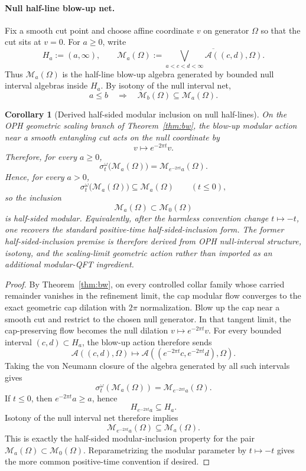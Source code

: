\documentclass[11pt]{article}
\newtheorem{corollary}[theorem]{Corollary}
\begin{document}
\paragraph{Null half-line blow-up net.}
Fix a smooth cut point and choose affine coordinate \(v\) on generator \(\Omega\) so that the cut sits at \(v=0\). For \(a\ge 0\), write
\[
H_a:=(a,\infty),
\qquad
\mathcal M_a(\Omega)
:=
\overline{\bigvee_{a<c<d<\infty}\mathcal A((c,d),\Omega)}.
\]
Thus \(\mathcal M_a(\Omega)\) is the half-line blow-up algebra generated by bounded null interval algebras inside \(H_a\). By isotony of the null interval net,
\[
a\le b
\quad\Longrightarrow\quad
\mathcal M_b(\Omega)\subseteq \mathcal M_a(\Omega).
\]

\begin{corollary}[Derived half-sided modular inclusion on null half-lines]\label{cor:n2}
On the OPH geometric scaling branch of Theorem~\ref{thm:bw}, the blow-up modular action near a smooth entangling cut acts on the null coordinate by
\[
v\mapsto e^{-2\pi t}v.
\]
Therefore, for every \(a\ge 0\),
\[
\sigma_t^\omega\bigl(\mathcal M_a(\Omega)\bigr)
=
\mathcal M_{e^{-2\pi t}a}(\Omega).
\]
Hence, for every \(a>0\),
\[
\sigma_t^\omega\bigl(\mathcal M_a(\Omega)\bigr)\subseteq \mathcal M_a(\Omega)
\qquad (t\le 0),
\]
so the inclusion
\[
\mathcal M_a(\Omega)\subset \mathcal M_0(\Omega)
\]
is half-sided modular. Equivalently, after the harmless convention change \(t\mapsto -t\), one recovers the standard positive-time half-sided-inclusion form. The former half-sided-inclusion premise is therefore derived from OPH null-interval structure, isotony, and the scaling-limit geometric action rather than imported as an additional modular-QFT ingredient.
\end{corollary}

\begin{proof}
By Theorem~\ref{thm:bw}, on every controlled collar family whose carried remainder vanishes in the refinement limit, the cap modular flow converges to the exact geometric cap dilation with \(2\pi\) normalization. Blow up the cap near a smooth cut and restrict to the chosen null generator. In that tangent limit, the cap-preserving flow becomes the null dilation \(v\mapsto e^{-2\pi t}v\). For every bounded interval \((c,d)\subset H_a\), the blow-up action therefore sends
\[
\mathcal A((c,d),\Omega)\longmapsto \mathcal A((e^{-2\pi t}c,e^{-2\pi t}d),\Omega).
\]
Taking the von Neumann closure of the algebra generated by all such intervals gives
\[
\sigma_t^\omega(\mathcal M_a(\Omega))
=
\mathcal M_{e^{-2\pi t}a}(\Omega).
\]
If \(t\le 0\), then \(e^{-2\pi t}a\ge a\), hence
\[
H_{e^{-2\pi t}a}\subseteq H_a.
\]
Isotony of the null interval net therefore implies
\[
\mathcal M_{e^{-2\pi t}a}(\Omega)\subseteq \mathcal M_a(\Omega).
\]
This is exactly the half-sided modular-inclusion property for the pair \(\mathcal M_a(\Omega)\subset \mathcal M_0(\Omega)\). Reparametrizing the modular parameter by \(t\mapsto -t\) gives the more common positive-time convention if desired.
\end{proof}
\end{document}
